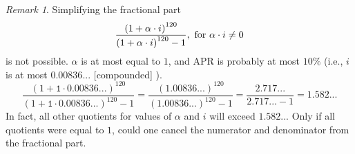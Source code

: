 \documentclass[12pt,letterpaper,oneside]{article}
\theoremstyle{remark} %
\newtheorem{remark}[theorem]{Remark}
\begin{document}
	\vspace{12pt}
	\begin{remark}
	Simplifying the fractional part
	$$\frac{\left(1+\alpha\cdot i\right)^{120}}{\left(1+\alpha\cdot i\right)^{120}-1},\mbox{ for }\alpha\cdot i\neq 0$$
	is not possible. $\alpha$ is at most equal to $1$, and $\mbox{APR}$ is probably at most $10\%$ (i.e., $i$ is at most $0.00836...$ [compounded] ).
	$$\frac{\left(1+\mathtt{1}\cdot\mathtt{0.00836...}\right)^{120}}{\left(1+\mathtt{1}\cdot\mathtt{0.00836...}\right)^{120}-1}=\frac{\left(\mathtt{1.00836...}\right)^{120}}{\left(\mathtt{1.00836...}\right)^{120}-1}=\frac{\mathtt{2.717...}}{\mathtt{2.717...}-1}=\mathtt{1.582...}$$
	In fact, all other quotients for values of $\alpha$ and $i$ will exceed $1.582...$ Only if all quotients were equal to $1$, could one cancel the numerator and denominator from the fractional part.
	\end{remark}
\end{document}

